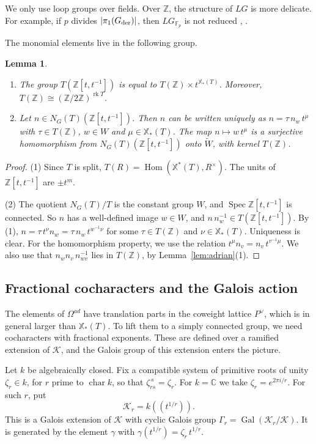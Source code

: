 \documentclass[psamsfonts]{amsart}
\newtheorem{lem}[thm]{Lemma}
\theoremstyle{definition}
\theoremstyle{remark}
\numberwithin{equation}{section}
\newcommand{\Z}{\mathbb{Z}}   %
\newcommand{\X}{\mathbb{X}}
\newcommand{\extw}{\widetilde{W}}
\DeclareMathOperator{\rk}{rk}
\DeclareMathOperator{\Hom}{Hom}
\DeclareMathOperator{\Gal}{Gal}
\DeclareMathOperator{\Spec}{Spec}
\DeclareMathOperator{\chara}{char}
\newcommand\cK{\mathcal{K}}
\newcommand{\CC}{\mathbb{C}}
\newcommand{\FF}{\mathbb{F}}
\newcommand{\der}{\textup{der}}
\numberwithin{equation}{section}
\newcommand{\lr}[1]{(\!(#1)\!)}
\newcommand{\Om}{\Omega}
\theoremstyle{plain}
\begin{document}
We only use loop groups over fields. Over $\Z$, the structure of $LG$ is more delicate. For example, if $p$ divides $|\pi_1(G_{\der})|$, then $LG_{\FF_p}$ is not reduced \cite[Remark~6.4]{PR08}, \cite{HLR24}.

The monomial elements live in the following group.

\begin{lem}\label{lem:integral-ext}
\begin{enumerate}[(1)]
\item The group $T(\Z[t,t^{-1}])$ is equal to $T(\Z)\times t^{\X_*(T)}$. Moreover, $T(\Z)\cong(\Z/2\Z)^{\rk T}$.
\item Let $n\in N_G(T)(\Z[t,t^{-1}])$. Then $n$ can be written uniquely as $n=\tau\,n_w\,t^{\mu}$ with $\tau\in T(\Z)$, $w\in W$ and $\mu\in\X_*(T)$. The map $n\mapsto w\,t^{\mu}$ is a surjective homomorphism from $N_G(T)(\Z[t,t^{-1}])$ onto $\extw$, with kernel $T(\Z)$.
\end{enumerate}
\end{lem}

\begin{proof}
(1) Since $T$ is split, $T(R)=\Hom(\X^*(T),R^\times)$. The units of $\Z[t,t^{-1}]$ are $\pm t^m$.

(2) The quotient $N_G(T)/T$ is the constant group $W$, and $\Spec\Z[t,t^{-1}]$ is connected. So $n$ has a well-defined image $w\in W$, and $n\,n_w^{-1}\in T(\Z[t,t^{-1}])$. By (1), $n=\tau\,t^{\nu}n_w=\tau\,n_w\,t^{w^{-1}\nu}$ for some $\tau\in T(\Z)$ and $\nu\in\X_*(T)$. Uniqueness is clear. For the homomorphism property, we use the relation $t^{\mu}n_{v}=n_{v}\,t^{v^{-1}\mu}$. We also use that $n_wn_v\,n_{wv}^{-1}$ lies in $T(\Z)$, by Lemma~\ref{lem:adrian}(1).
\end{proof}

\subsection{Fractional cocharacters and the Galois action}\label{subsec:galois}
The elements of $\Om^{ad}$ have translation parts in the coweight lattice $P^\vee$, which is in general larger than $\X_*(T)$. To lift them to a simply connected group, we need cocharacters with fractional exponents. These are defined over a ramified extension of $\cK$, and the Galois group of this extension enters the picture.

Let $k$ be algebraically closed. Fix a compatible system of primitive roots of unity $\zeta_r\in k$, for $r$ prime to $\chara k$, so that $\zeta_{rs}^{\,s}=\zeta_r$. For $k=\CC$ we take $\zeta_r=e^{2\pi i/r}$. For such $r$, put
\[
\cK_r=k\lr{t^{1/r}}.
\]
This is a Galois extension of $\cK$ with cyclic Galois group $\Gamma_r=\Gal(\cK_r/\cK)$. It is generated by the element $\gamma$ with $\gamma(t^{1/r})=\zeta_r\,t^{1/r}$.
\end{document}
